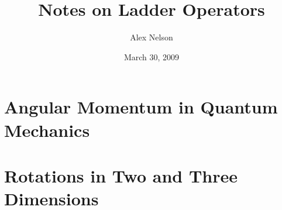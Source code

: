 \documentclass{amsart}
\title{Notes on Ladder Operators}
\author{Alex Nelson}
\date{March 30, 2009}
\numberwithin{equation}{section}
\begin{document}
\maketitle
\section{Angular Momentum in Quantum Mechanics}

\section{Rotations in Two and Three Dimensions}

\end{document}
